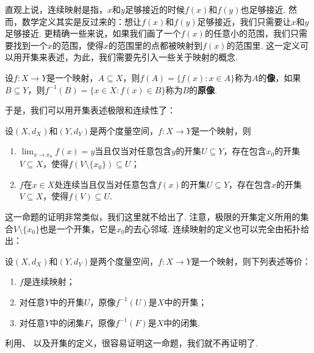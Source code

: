 直观上说，连续映射是指，$x$和$y$足够接近的时候$f(x)$和$f(y)$也足够接近. 然而，数学定义其实是反过来的：想让$f(x)$和$f(y)$足够接近，我们只需要让$x$和$y$足够接近. 更精确一些来说，如果我们画了一个$f(x)$的任意小的范围，我们只需要找到一个$x$的范围，使得$x$的范围里的点都被映射到$f(x)$的范围里. 这一定义可以用开集来表述，为此，我们需要先引入一些关于映射的概念. 

\begin{definition}[像，原像]
    设$f:X\to Y$是一个映射，$A\subseteq X$，则$f(A)=\{f(x):x\in A\}$称为$A$的\textbf{像}，如果$B\subseteq Y$，则$f^{-1}(B)=\{x\in X:f(x)\in B\}$称为$B$的\textbf{原像}. 
\end{definition}

于是，我们可以用开集表述极限和连续性了：

\begin{proposition}\label{prop:continuous-open}
    设$(X,d_X)$和$(Y,d_Y)$是两个度量空间，$f:X\to Y$是一个映射，则
\begin{enumerate}
    \item $\lim_{x\to x_0} f(x)=y$当且仅当对任意包含$y$的开集$U\subseteq Y$，存在包含$x_0$的开集$V\subseteq X$，使得$f(V\setminus\{x_0\})\subseteq U$；
    \item  $f$在$x\in X$处连续当且仅当对任意包含$f(x)$的开集$U\subseteq Y$，存在包含$x$的开集$V\subseteq X$，使得$f(V)\subseteq U$.
\end{enumerate}
\end{proposition}
这一命题的证明非常类似，我们这里就不给出了. 注意，极限的开集定义所用的集合$V\setminus\{x_0\}$也是一个开集，它是$x_0$的去心邻域. 连续映射的定义也可以完全由拓扑给出：

\begin{proposition}\label{prop:continuous-topology}
    设$(X,d_X)$和$(Y,d_Y)$是两个度量空间，$f:X\to Y$是一个映射，则下列表述等价：
    \begin{enumerate}
        \item $f$是连续映射；
        \item 对任意$Y$中的开集$U$，原像$f^{-1}(U)$是$X$中的开集；
        \item 对任意$Y$中的闭集$F$，原像$f^{-1}(F)$是$X$中的闭集. 
    \end{enumerate}
\end{proposition}
利用、 以及开集的定义，很容易证明这一命题，我们就不再证明了. 

